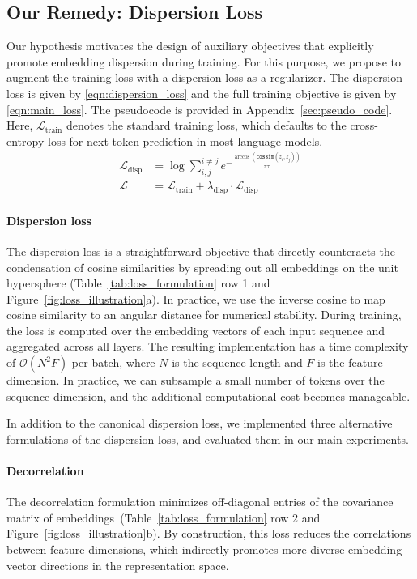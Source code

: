 \documentclass{article}
\theoremstyle{plain}
\theoremstyle{definition}
\theoremstyle{remark}
\begin{document}
\subsection{Our Remedy: Dispersion Loss}
\label{sec:dispersion_loss}
Our hypothesis motivates the design of auxiliary objectives that explicitly promote embedding dispersion during training. For this purpose, we propose to augment the training loss with a dispersion loss as a regularizer. The dispersion loss is given by \eqref{eqn:dispersion_loss} and the full training objective is given by \eqref{eqn:main_loss}. The pseudocode is provided in Appendix~\ref{sec:pseudo_code}. Here, $\mathcal{L}_\text{train}$ denotes the standard training loss, which defaults to the cross-entropy loss for next-token prediction in most language models.
\vspace{-4pt}
\begin{align}
\label{eqn:dispersion_loss}
\mathcal{L}_\text{disp} &= \log \sum\nolimits_{i,j}^{i \neq j} e^{-\frac{\arccos \left( \texttt{cossim}(z_i, z_j) \right)}{\pi \tau}}\\
\label{eqn:main_loss}
\mathcal{L} &= \mathcal{L}_{\text{train}} + \lambda_\text{disp} \cdot \mathcal{L}_{\text{disp}}
\end{align}
\paragraph{Dispersion loss}
\vspace{-8pt}
The dispersion loss is a straightforward objective that directly counteracts the condensation of cosine similarities by spreading out all embeddings on the unit hypersphere (Table~\ref{tab:loss_formulation} row 1 and Figure~\ref{fig:loss_illustration}a). In practice, we use the inverse cosine to map cosine similarity to an angular distance for numerical stability. During training, the loss is computed over the embedding vectors of each input sequence and aggregated across all layers. The resulting implementation has a time complexity of $\mathcal{O}(N^2 F)$ per batch, where $N$ is the sequence length and $F$ is the feature dimension. In practice, we can subsample a small number of tokens over the sequence dimension, and the additional computational cost becomes manageable.

In addition to the canonical dispersion loss, we implemented three alternative formulations of the dispersion loss, and evaluated them in our main experiments.

\paragraph{Decorrelation}
The decorrelation formulation minimizes off-diagonal entries of the covariance matrix of embeddings~(Table~\ref{tab:loss_formulation} row 2 and Figure~\ref{fig:loss_illustration}b). By construction, this loss reduces the correlations between feature dimensions, which indirectly promotes more diverse embedding vector directions in the representation space.
\end{document}
